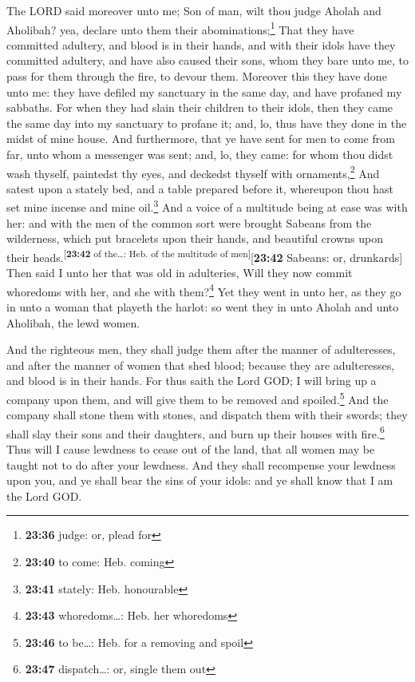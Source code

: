  The LORD said moreover unto me; Son of man, wilt thou
judge Aholah and Aholibah? yea, declare unto them their
abominations;\footnote{\textbf{23:36} judge: or, plead for}
 That they have committed adultery, and blood is in their
hands, and with their idols have they committed adultery, and have also
caused their sons, whom they bare unto me, to pass for them through the
fire, to devour them.  Moreover this they have done unto
me: they have defiled my sanctuary in the same day, and have profaned my
sabbaths.  For when they had slain their children to
their idols, then they came the same day into my sanctuary to profane
it; and, lo, thus have they done in the midst of mine house.
 And furthermore, that ye have sent for men to come from
far, unto whom a messenger was sent; and, lo, they came: for whom thou
didst wash thyself, paintedst thy eyes, and deckedst thyself with
ornaments,\footnote{\textbf{23:40} to come: Heb. coming} 
And satest upon a stately bed, and a table prepared before it, whereupon
thou hast set mine incense and mine oil.\footnote{\textbf{23:41}
  stately: Heb. honourable}  And a voice of a multitude
being at ease was with her: and with the men of the common sort were
brought Sabeans from the wilderness, which put bracelets upon their
hands, and beautiful crowns upon their
heads.\textsuperscript{{[}\textbf{23:42} of the\ldots: Heb. of the
multitude of men{]}}{[}\textbf{23:42} Sabeans: or, drunkards{]}
 Then said I unto her that was old in adulteries, Will
they now commit whoredoms with her, and she with them?\footnote{\textbf{23:43}
  whoredoms\ldots: Heb. her whoredoms}  Yet they went in
unto her, as they go in unto a woman that playeth the harlot: so went
they in unto Aholah and unto Aholibah, the lewd women.

 And the righteous men, they shall judge them after the
manner of adulteresses, and after the manner of women that shed blood;
because they are adulteresses, and blood is in their hands.
 For thus saith the Lord GOD; I will bring up a company
upon them, and will give them to be removed and spoiled.\footnote{\textbf{23:46}
  to be\ldots: Heb. for a removing and spoil}  And the
company shall stone them with stones, and dispatch them with their
swords; they shall slay their sons and their daughters, and burn up
their houses with fire.\footnote{\textbf{23:47} dispatch\ldots: or,
  single them out}  Thus will I cause lewdness to cease
out of the land, that all women may be taught not to do after your
lewdness.  And they shall recompense your lewdness upon
you, and ye shall bear the sins of your idols: and ye shall know that I
am the Lord GOD.

